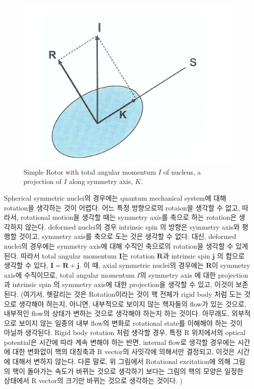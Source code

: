\documentclass[11pt]{book}
\def\bm{\boldsymbol}
\begin{document}
\begin{figure}
	\centering
	\includegraphics[width=0.7\linewidth]{rotor}
	\caption{Simple Rotor with total angular momentum $I$ of nucleus,
	         a projection of $I$ along symmetry axis, $K$.  }
	\label{fig:rotor}
\end{figure}

Spherical symmetric nuclei의 경우에는 quantum mechanical system에 대해
rotation을 생각하는 것이 어렵다. 어느 특정 방향으로의 rotaion을 생각할 수 없고,
따라서, rotational motion을 생각할 때는 symmetry axis를 축으로 하는 rotation은 
생각하지 않는다. deformed nuclei의 경우 intrinsic spin 의 방향은 symmetry axis와 
평행할 것이고, symmetry axis를 축으로 도는 것은 생각할 수 없다. 대신,
deformed nuclei의 경우에는 symmetry axis에 대해 
수직인 축으로의 rotation을 생각할 수 있게 된다. 
따라서 total angular momentum ${\bm I}$는
rotation ${\bm R}$과 intrinsic spin ${\bm j}$ 의 합으로 생각할 수 있다,
${\bm I}={\bm R}+{\bm j}$. 이 때, axial symmetric nuclei의 경우에는 
${\bm R}$이 symmetry axis에 수직이므로, total angular momentum $I$의 
symmetry axis 에 대한 projection 과 intrinsic spin 의 symmetry axis에 대한
projection을 생각할 수 있고, 이것이 보존된다. 
(여기서, 헷갈리는 것은 Rotation이라는 것이 
핵 전체가 rigid body 처럼 도는 것으로 생각해야 하는지,
아니면, 내부적으로 보이지 않는 핵자들의 flow가 있는 것으로, 
내부적인 flow의 상태가 변하는 것으로 생각해야 하는지 하는 것이다. 
아무래도, 외부적으로 보이지 않는 일종의 내부 flow의 변화로 
rotational state를 이해해야 하는 것이 아닐까 생각된다. 
Rigid body rotation 처럼 생각할 경우, 특정 R 위치에서의
optical potential은 시간에 따라 계속 변해야 하는 반면,
internal flow로 생각할 경우에는 시간에 대한 변화없이
핵의 대칭축과 R vector의 사잇각에 의해서만 결정되고,
이것은 시간에 대해서 변하지 않는다.
다른 말로, 위 그림에서 Rotational excitation에 의해 그림의
핵이 돌아가는 속도가 바뀌는 것으로 생각하기 보다는 
그림의 핵의 모양은 일정한 상태에서 R vector의 크기만
바뀌는 것으로 생각하는 것이다. )
\end{document}
